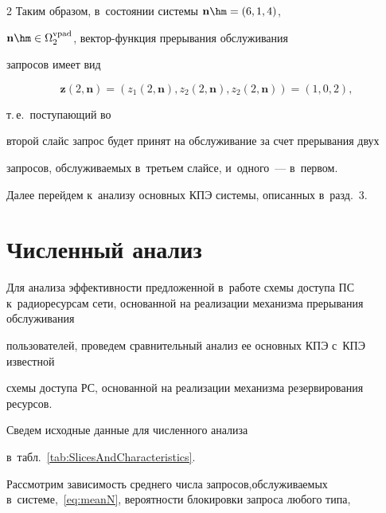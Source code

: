 \begin{multicols}{2}
Таким образом, в~состоянии системы $\mathbf{n}\hm=\left(6,1,4\right)$, 


$\mathbf{n}\hm\in\Omega_2^{\mathrm{vpad}}$, век\-тор-функ\-ция прерывания обслуживания 


запросов имеет вид 


$$


\mathbf{z}\left(2,\mathbf{n}\right)=\left(z_1\left(2,\mathbf{n}\right), 


z_2\left(2,\mathbf{n}\right), 


z_2\left(2,\mathbf{n}\right)\right)=\left(1,0,2\right),


$$


 т.\,е.\ поступающий во 


второй слайс запрос будет принят на обслуживание за счет прерывания двух 


запросов, об\-слу\-жи\-ва\-емых в~третьем слайсе, и~одного~--- в~первом.





Далее перейдем к~анализу основных КПЭ сис\-те\-мы, описанных в~разд.~3.











\section{Численный анализ}







Для анализа эффективности предложенной в~работе схемы доступа ПС к~радиоресурсам сети, основанной на реализации механизма прерывания обслуживания 


пользователей, проведем \mbox{сравнительный} анализ ее основных КПЭ с~КПЭ известной 


схемы доступа РС, основанной на реализации механизма резервирования ресурсов. 


Сведем исходные данные для численного анализа 


в~табл.~\ref{tab:SlicesAndCharacteristics}.


Рас\-смот\-рим зависимость среднего числа запросов,\linebreak об\-слу\-жи\-ва\-емых в~сис\-те\-ме,~\eqref{eq:meanN}, вероятности блокировки запроса любого типа, 



\end{multicols}
